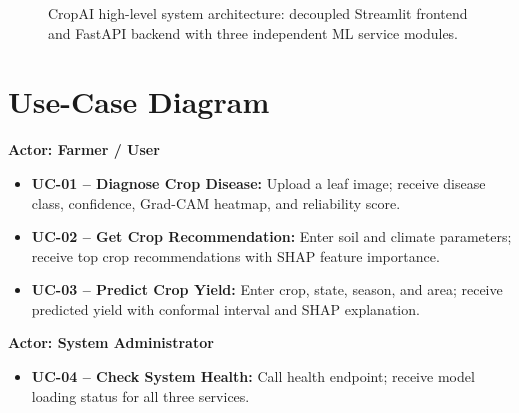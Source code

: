 \documentclass[12pt,a4paper]{report}
\begin{document}
\begin{figure}[h!]
\centering
\setlength{\fboxsep}{8pt}
\caption{CropAI high-level system architecture: decoupled Streamlit frontend and FastAPI backend with three independent ML service modules.}
\label{fig:architecture}
\end{figure}

\section{Use-Case Diagram}
\textbf{Actor: Farmer / User}
\begin{itemize}[leftmargin=*]
  \item \textbf{UC-01 -- Diagnose Crop Disease:} Upload a leaf image; receive disease class, confidence, Grad-CAM heatmap, and reliability score.
  \item \textbf{UC-02 -- Get Crop Recommendation:} Enter soil and climate parameters; receive top crop recommendations with SHAP feature importance.
  \item \textbf{UC-03 -- Predict Crop Yield:} Enter crop, state, season, and area; receive predicted yield with conformal interval and SHAP explanation.
\end{itemize}
\textbf{Actor: System Administrator}
\begin{itemize}[leftmargin=*]
  \item \textbf{UC-04 -- Check System Health:} Call health endpoint; receive model loading status for all three services.
\end{itemize}
\end{document}
